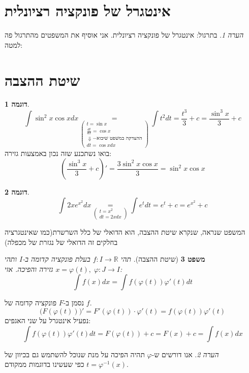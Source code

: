 \documentclass[12pt]{article}
\makeatletter
\let\oldint\int
\renewcommand{\int}{\oldint\limits}
\theoremstyle{plain}
\newtheorem{theorem}{משפט}[section]      %
\theoremstyle{definition}
\newtheorem{example}[theorem]{דוגמה}      %
\theoremstyle{remark}
\newtheorem*{remark}{הערה}                %
\renewenvironment{proof}[1][\proofname]{\par
  \pushQED{\qed}%
  \normalfont \topsep6\p@\@plus6\p@\relax
  \trivlist
  \item[\hskip\labelsep\itshape #1\@addpunct{.}]\par\ignorespaces
}{%
  \popQED\endtrivlist\@endpefalse
}
\renewcommand{\qed}{\par\nobreak\hfill\qedsymbol\par}
\renewcommand{\proofname}{הוכחה}          %
\makeatother
\begin{document}
\section{אינטגרל של פונקציה רציונלית}
\begin{remark}
בתרגול: אינטגרל של פונקציה רציונלית.\newline{}
אני אוסיף את המשפטים מהתרגול פה למטה:
\end{remark}
\section{שיטת ההצבה}
\begin{example}
\[
{\int \sin^2x\cos xdx \underset{\begin{pmatrix}
t=\sin x \\
\frac{dt}{dx}=\cos x \\
\Downarrow - {\text{ההצדקה במשפט שיבוא}} \\
dt=\cos xdx
\end{pmatrix}}{=} \int t^2dt=\frac{t^3}{3}+c=\frac{\sin^3x}{3}+c}
\]
בואו נשתכנע שזה נכון באמצעות גזירה:\[
{\left( \frac{\sin^3x}{3}+c \right)'=\frac{3\sin^2x\cos x}{3}=\sin^2x\cos x}
\]

\end{example}
\begin{example}
\[
{\int 2xe^{x^2}dx \underset{\begin{pmatrix}
t=x^2 \\
dt=2xdx
\end{pmatrix}}{=}\int e^tdt=e^t+c=e^{x^2}+c}
\]

\end{example}
המשפט שנראה, שנקרא שיטת ההצבה, הוא הדואלי של כלל השרשרת(כמו שאינטגרציה בחלקים זה הדואלי של נגזרת של מכפלה)\begin{theorem}[שיטת ההצבה]
תהי \({f:I\to \mathbb{R}}\) בעלת פונקציה קדומה ב-\({I}\) ותהי \({x=\varphi(t),\;\varphi:J\to I}\) גזירה והפיכה. אזי:\[
{\int f(x)dx=\int f(\varphi(t))\varphi'(t)dt}
\]

\end{theorem}
\begin{proof}
נסמן ב-\({F}\) פונקציה קדומה של \({f}\).\[
{{\Big(}F(\varphi(t)){\Big)}'=F'(\varphi(t))\cdot \varphi'(t)=f(\varphi(t))\varphi'(t)}
\]
נפעיל אינטגרל על שני האגפים:\[
{\int f(\varphi(t))\varphi'(t)dt=F(\varphi(t))+c=F(x)+c=\int f(x)dx}
\]

\end{proof}
\begin{remark}
אנו דורשים ש-\({\varphi}\) תהיה הפיכה על מנת שנוכל להשתמש גם בכיוון של \({t=\varphi^{-1}(x)}\) כפי שעשינו בדוגמות ממקודם.
\end{remark}
\end{document}
